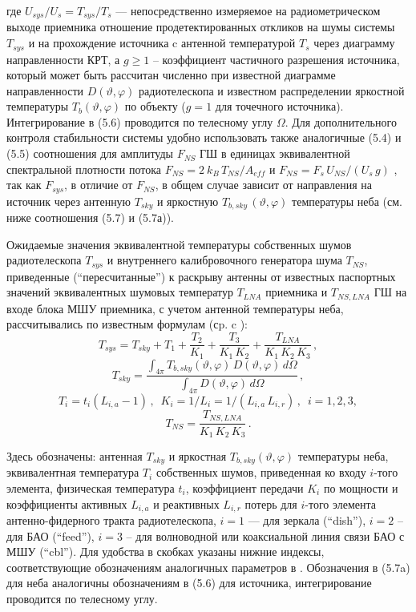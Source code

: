 \noindent
где $ U_{sys} / U_s = T_{sys} / T_s$ --- непосредственно измеряемое на
радиометрическом выходе приемника отношение продетектированных
откликов на шумы системы $T_{sys}$ и на прохождение источника c
антенной температурой $T_s$ через диаграмму направленности КРТ,
а $g \ge 1$ -- коэффициент частичного разрешения источника,
который может быть рассчитан численно при известной диаграмме
направленности $D(\vartheta, \varphi)$ радиотелескопа и
известном распределении яркостной температуры
$T_b (\vartheta, \varphi)$
по объекту ($g = 1$ для точечного источника).
Интегрирование в (5.6) проводится по телесному углу $\Omega$.
Для дополнительного контроля
стабильности системы удобно использовать также
аналогичные (5.4) и (5.5) соотношения для амплитуды $F_{NS}$
ГШ в единицах эквивалентной спектральной плотности потока
$F_{NS} = 2\ k_B\, T_{NS} / A_{eff}$ и
$F_{NS} = F_s\, U_{NS} / (U_s\, g)$  \cite{Kovalev_1999},
так как $F_{sys}$, в отличие от $F_{NS}$, в общем случае зависит от
направления на источник через антенную $T_{sky}$ и яркостную
$T_{b,sky}\, (\vartheta, \varphi)$ температуры неба (см. ниже
соотношения (5.7) и (5.7а)).

Ожидаемые значения эквивалентной температуры собственных шумов радиотелескопа
$T_{sys}$ и внутреннего калибровочного генератора шума $T_{NS}$,
приведенные (``пересчитанные'') к раскрыву антенны от известных паспортных
значений эквивалентных шумовых температур $T_{LNA}$ приемника и $T_{NS,LNA}$ ГШ
на входе блока МШУ приемника, с учетом антенной температуры
неба, рассчитывались по известным формулам (сp. c  \cite{}):
$$
T_{sys} = T_{sky} + T_1 + \frac{T_2}{K_1} +
\frac{T_3}{K_1\, K_2} + \frac{T_{LNA}}{K_1\, K_2\, K_3}\,,
$$
$$
T_{sky} = \frac{\int_{4 \pi}^{}{T_{b,sky} (\vartheta, \varphi)\, D(\vartheta, \varphi)\, d\Omega}}
{\int_{4 \pi}^{}{D(\vartheta, \varphi)\, d \Omega}} \,,
$$
$$
T_i = t_i (L_{i,a} -1)\, , \,\,\,
K_i = 1/ L_i = 1 / (L_{i,a}\, L_{i,r})\, , \,\,\, i = 1, 2, 3,
$$
$$
T_{NS} = \frac{T_{NS,LNA}}{K_1\, K_2\, K_3}\,.
$$


\noindent
Здесь обозначены: антенная $T_{sky}$ и яркостная  $T_{b,sky} (\vartheta, \varphi)$
температуры неба, эквивалентная температура $T_i$ собственных шумов,
приведенная ко входу $i$-того элемента,
физическая температура $t_i$, коэффициент передачи $K_i$ по мощности
и коэффициенты активных $L_{i,a}$ и реактивных $L_{i,r}$ потерь
для $i$-того элемента антенно-фидерного тракта радиотелескопа,
$i = 1$ --- для зеркала (``dish''), $i = 2$ -- для БАО (``feed''),
$i = 3$ -- для волноводной или коаксиальной линия связи БАО с МШУ (``cbl'').
Для удобства в скобках указаны нижние индексы, соответствующие обозначениям
аналогичных параметров в \cite{}.
Обозначения в (5.7a) для неба аналогичны обозначениям в (5.6) для источника,
интегрирование проводится по телесному углу.

